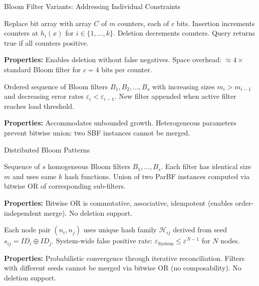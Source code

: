 \documentclass{beamer}
\begin{document}
\begin{frame}{Bloom Filter Variants: Addressing Individual Constraints}

    \begin{definition}
        Replace bit array with array $C$ of $m$ counters, each of $c$ bits. Insertion increments counters at $h_i(x)$ for $i \in \{1,\ldots,k\}$. Deletion decrements counters. Query returns true if all counters positive.
    \end{definition}

    \textbf{Properties:} Enables deletion without false negatives. Space overhead: $\approx 4\times$ standard Bloom filter for $c=4$ bits per counter.

    \begin{definition}
        Ordered sequence of Bloom filters $B_1, B_2, \ldots, B_s$ with increasing sizes $m_i > m_{i-1}$ and decreasing error rates $\varepsilon_i < \varepsilon_{i-1}$. New filter appended when active filter reaches load threshold.
    \end{definition}

    \textbf{Properties:} Accommodates unbounded growth. Heterogeneous parameters prevent bitwise union: two SBF instances cannot be merged.

\end{frame}

\begin{frame}{Distributed Bloom Patterns}

    \begin{definition}
        Sequence of $s$ homogeneous Bloom filters $B_1, \ldots, B_s$. Each filter has identical size $m$ and uses same $k$ hash functions. Union of two ParBF instances computed via bitwise OR of corresponding sub-filters.
    \end{definition}

    \textbf{Properties:} Bitwise OR is commutative, associative, idempotent
    (enables order-independent merge). No deletion support.

    \begin{definition}
        Each node pair $(n_i, n_j)$ uses unique hash family $\mathcal{H}_{ij}$ derived from seed $s_{ij} = ID_i \oplus ID_j$. System-wide false positive rate: $\varepsilon_{\text{System}} \leq \varepsilon^{N-1}$ for $N$ nodes.
    \end{definition}

    \textbf{Properties:} Probabilistic convergence through iterative reconciliation. Filters with different seeds cannot be merged via bitwise OR (no composability). No deletion support.

\end{frame}
\end{document}
